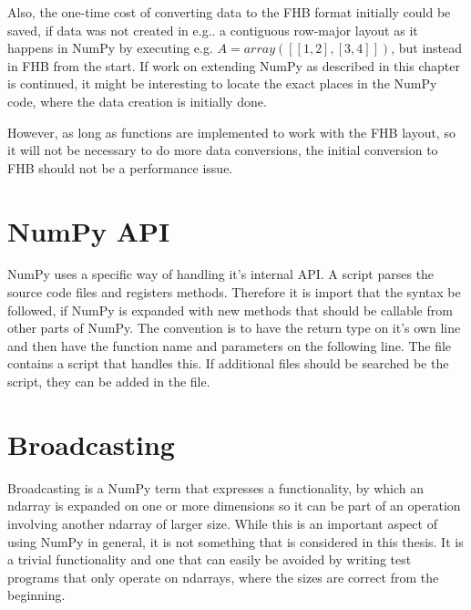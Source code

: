 Also, the one-time cost of converting data to the FHB format initially
could be saved, if data was not created in e.g.. a contiguous
row-major layout as it happens in NumPy by executing e.g. $A =
array([[1,2],[3,4]])$, but instead in FHB from the
start. If work on extending NumPy as described in this chapter is
continued, it might be interesting to locate the exact places in the
NumPy code, where the data creation is initially done.

However, as long as functions are implemented to work with the FHB layout, so it will not be necessary to do more data conversions,
the initial conversion to FHB should not be a performance issue.



\section{NumPy API}
NumPy uses a specific way of handling it's internal API. A script
parses the source code files and registers methods. Therefore it is
import that the syntax be followed, if NumPy is expanded with new
methods that should be callable from other parts of NumPy. The
convention is to have the return type on it's own line and then have
the function name and parameters on the following line. The file
 contains a script that handles this. If additional files
should be searched be the script, they can be added in the file.

\section{Broadcasting}
Broadcasting is a NumPy term that expresses a functionality, by which
an ndarray is expanded on one or more dimensions so it can be part of
an operation involving another ndarray of larger size. While this is
an important aspect of using NumPy in general, it is not something
that is considered in this thesis. It is a trivial functionality and
one that can easily be avoided by writing test programs that only
operate on ndarrays, where the sizes are correct from the beginning.

